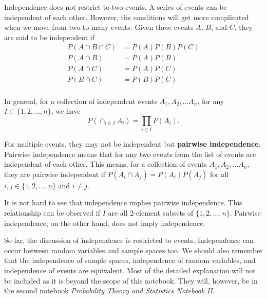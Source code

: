 \documentclass[11pt, a4paper, oneside]{book}
\theoremstyle{definition}
\begin{document}
\noindent Independence does not restrict to two events. A series of events can be independent of each other. However, the conditions will get more complicated when we move from two to many events. Given three events $A$, $B$, and $C$, they are said to be independent if
\begin{equation*}
\begin{split}
P(A \cap B \cap C) &= P(A) P(B) P(C) \\
P(A \cap B) &= P(A) P(B) \\
P(A \cap C) &= P(A) P(C) \\
P(B \cap C) &= P(B) P(C) \\
\end{split}
\end{equation*}

\noindent In general, for a collection of independent events $A_1, A_2, \dots A_n$, for any $I \subset \{1, 2, \dots, n\}$, we have \[
P(\cap_{i \in I}A_i) = \prod_{i \in I}P(A_i).
\]

\noindent For multiple events, they may not be independent but \textbf{pairwise independence}. Pairwise independence means that for any two events from the list of events are independent of each other. This means, for a collection of events $A_1, A_2, \dots A_n$, they are pairwise independent if $P(A_i \cap A_j) = P(A_i)P(A_j)$ for all $i, j \in \{ 1, 2, \dots, n\}$ and $i \neq j$.  

\noindent It is not hard to see that independence implies pairwise independence. This relationship can be observed if $I$ are all 2-element subsets of $\{1, 2, \dots, n\}$. Pairwise independence, on the other hand, does not imply independence. 

\noindent So far, the discussion of independence is restricted to events. Independence can occur between random variables and sample spaces too. We should also remember that the independence of sample spaces, independence of random variables, and independence of events are equivalent. Most of the detailed explanation will not be included as it is beyond the scope of this notebook. They will, however, be in the second notebook \emph{Probability Theory and Statistics Notebook II}.

\backmatter
\end{document}
